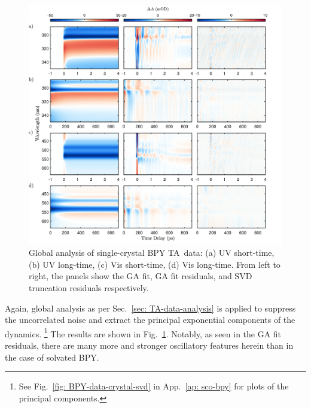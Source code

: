 \begin{figure}[t!]
  \centering
  \includegraphics[width = \textwidth]{Figures/fig_BPY_data_crystal_resi.pdf}
  \caption[Global analysis of single-crystal BPY TA~data.]{
    Global analysis of single-crystal BPY TA~data:
    (a) UV short-time, (b) UV long-time, (c) Vis short-time, (d) Vis long-time.
    From left to right, the panels show
    the GA fit, GA fit residuals, and SVD truncation residuals respectively.
  }
  \label{fig: BPY-data-crystal-resi}
\end{figure}
%
Again, global analysis as per Sec.~\ref{sec: TA-data-analysis}
is applied to suppress the uncorrelated noise and extract the principal exponential components
of the dynamics.%
\footnote{See Fig.~\ref{fig: BPY-data-crystal-svd} in App.~\ref{ap: sco-bpy}
for plots of the principal components.} The results are shown in
Fig.~\ref{fig: BPY-data-crystal-resi}.
%
Notably, as seen in the GA fit residuals,
there are many more and stronger oscillatory features herein than in the case of solvated BPY.

